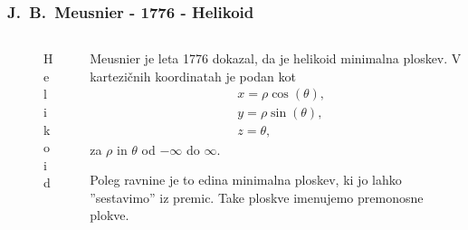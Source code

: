 \documentclass[8pt]{beamer}
\newcommand{\samplescalar}{50} %
\theoremstyle{definition}
\theoremstyle{remark}
\theoremstyle{plain}
\numberwithin{equation}{section}  %
\begin{document}
\begin{frame}
    \frametitle{J.~B.~Meusnier - 1776 - Helikoid}
    \begin{columns}
        \begin{column}{0.5\textwidth}
            \centering
            \begin{figure}[H]
                \centering
            
                \caption{Helikoid}
            \end{figure}
        \end{column}

        \begin{column}{0.5\textwidth}
            Meusnier je leta 1776 dokazal, da je helikoid minimalna ploskev. V kartezičnih koordinatah je podan kot
            \begin{align*}
                & x=\rho \cos (\theta), \\
                & y=\rho \sin (\theta), \\
                & z=\theta,
            \end{align*}
            za $\rho$ in $\theta$ od $-\infty$ do $\infty$.

            \vspace{0.8em}
            
            Poleg ravnine je to edina minimalna ploskev, ki jo lahko ”sestavimo” iz premic. Take ploskve imenujemo \textcolor{red1}{premonosne plokve}.
            
        \end{column}
    \end{columns}
\end{frame}
\end{document}
